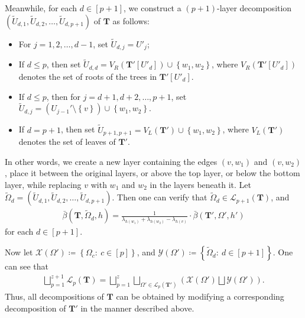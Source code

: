 \documentclass[superscriptaddress,onecolumn,nofootinbib,longbibliography,a4paper,accepted=2026-09-29]{quantumarticle}
\theoremstyle{plain}
\theoremstyle{definition}
\numberwithin{thm}{section}
\numberwithin{assumption}{section}
\numberwithin{lemma}{section}
\numberwithin{prop}{section}
\numberwithin{cor}{section}
\numberwithin{definition}{section}
\numberwithin{rmk}{section}
\numberwithin{equation}{section}
\newcommand{\lrb}[1]{\left ( #1 \right )}
\newcommand{\lrcb}[1]{\left \{ #1 \right \}}
\newcommand{\defeq}{\coloneqq}
\newcommand{\mbf}{\mathbf{T}}
\begin{document}
\begin{itemize}
Meanwhile, for each $d \in [p+1]$, we construct a $(p+1)$-layer decomposition $(\tilde{U}_{d,1}, \tilde{U}_{d,2}, \dots, \tilde{U}_{d,p+1})$
of $\mbf$ as follows: 
\begin{itemize}
    \item For $j=1,2,\dots,d-1$, set $\tilde{U}_{d,j}=U'_j$;   
    \item If $d \le p$, then set $\tilde{U}_{d,d}=V_R(\mbf'[U'_d]) \cup \lrcb{w_1, w_2}$, where $V_R(\mbf'[U'_d])$ denotes the set of roots of the trees in $\mbf'[U'_d]$.
    \item If $d \le p$, then for $j=d+1,d+2,\dots,p+1$, set $\tilde{U}_{d,j}=(U_{j-1}' \setminus \lrcb{v}) \cup \lrcb{w_1, w_2}$.    
    \item If $d=p+1$, then set $\tilde{U}_{p+1, p+1}=V_L(\mbf') \cup \lrcb{w_1, w_2}$, where $V_L(\mbf')$ denotes the set of leaves of $\mbf'$.
\end{itemize}
In other words, we create a new layer containing the edges $(v, w_1)$ and $(v, w_2)$, place it between the original layers, or above the top layer, or below the bottom layer, while replacing $v$ with $w_1$ and $w_2$ in the layers beneath it. Let $\tilde{\Omega}_d = (\tilde{U}_{d,1}, \tilde{U}_{d,2}, \dots, \tilde{U}_{d,p+1})$. Then one can verify that
$\tilde{\Omega}_d\in \mathcal{L}_{p+1}(\mbf)$, and 
\begin{align}
\bar{\beta}(\mbf, \tilde{\Omega}_d, h)
=\frac{1}{\lambda_{h(w_1)}+\lambda_{h(w_2)}-\lambda_{h(v)}} \cdot
\bar{\beta}(\mbf', \Omega', h')
\label{eq:induction_relation2}
\end{align}
for each $d \in [p+1]$. 

Now let $\mathcal{X}(\Omega')\defeq\lrcb{\Omega_c:~c \in [p]}$, 
and $\mathcal{Y}(\Omega')\defeq\lrcb{\tilde{\Omega}_d:~d \in [p+1]}$. One can see that
\begin{align}
\bigsqcup_{p=1}^{z+1}\mathcal{L}_{p}(\mbf) = 
\bigsqcup_{p=1}^z
\bigsqcup_{\Omega' \in \mathcal{L}_p(\mbf')}
\lrb{\mathcal{X}(\Omega')
\bigsqcup \mathcal{Y}(\Omega')}.
\label{eq:induction_partition}
\end{align}
Thus, all decompositions of $\mbf$ can be obtained by modifying a corresponding decomposition of $\mbf'$ in the manner described above.


\end{itemize}
\end{document}

